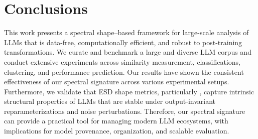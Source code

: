 \section{Conclusions}\label{s:conclusion}
This work presents a spectral shape–based framework for large-scale analysis of LLMs that is data-free, computationally efficient, and robust to post-training transformations. We curate and benchmark a large and diverse LLM corpus and conduct extensive experiments across similarity measurement, classifications, clustering, and performance prediction. Our results have shown the consistent effectiveness of our spectral signature across various experimental setups. Furthermore, we validate that ESD shape metrics, particularly \ALPHAHILL, capture intrinsic structural properties of LLMs that are stable under output-invariant reparameterizations and noise perturbations. Therefore, our spectral signature can provide a practical tool for managing modern LLM ecosystems, with implications for model provenance, organization, and scalable evaluation.

